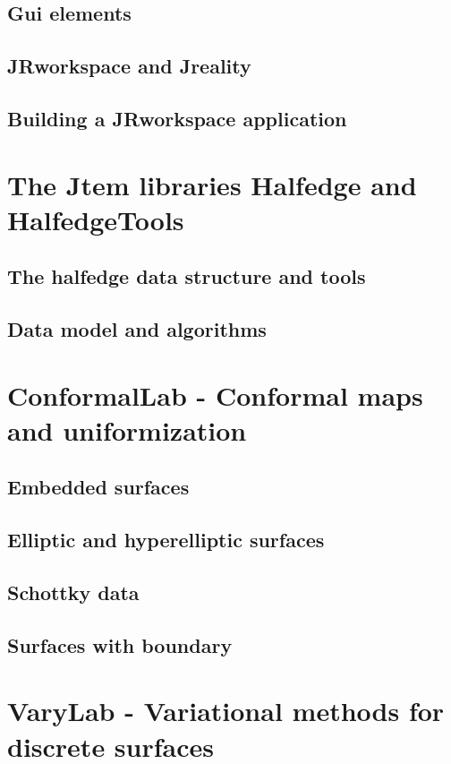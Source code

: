 \subsection{Gui elements}
\subsection{{\sc JRworkspace} and {\sc Jreality}}
\subsection{Building a {\sc JRworkspace} application}

\section{The {\sc Jtem} libraries {\sc Halfedge} and {\sc HalfedgeTools}}
\label{sec:halfedge_halfedgetools}
\subsection{The halfedge data structure and tools}
\subsection{Data model and algorithms}

\section{{\sc ConformalLab} - Conformal maps and uniformization}
\label{sec:conformallab}
\subsection{Embedded surfaces}
\subsection{Elliptic and hyperelliptic surfaces}
\subsection{Schottky data}
\subsection{Surfaces with boundary}

\section{{\sc VaryLab} - Variational methods for discrete surfaces}
\label{sec:varylab}

